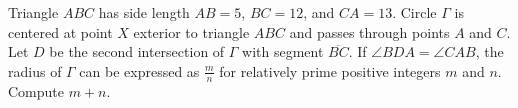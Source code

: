 Triangle $ABC$ has side length $AB = 5$, $BC = 12$, and $CA = 13$. Circle $\Gamma$ is centered at point $X$ exterior to triangle $ABC$ and passes through points $A$ and $C$. Let $D$ be the second intersection of $\Gamma$ with segment $\overline{BC}$. If $\angle BDA = \angle CAB$, the radius of $\Gamma$ can be expressed as $\frac{m}{n}$ for relatively prime positive integers $m$ and $n$. Compute $m+n$. 